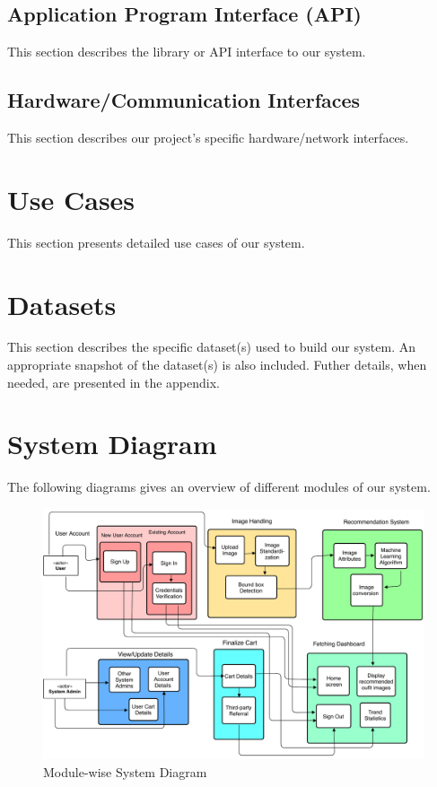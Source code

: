 \subsection{Application Program Interface (API)}
This section describes the library or API interface to our system.

\subsection{Hardware/Communication Interfaces}
This section describes our project's specific hardware/network interfaces.

\section{Use Cases}
This section presents detailed use cases of our system.

\section{Datasets}
This section describes the specific dataset(s) used to build our system. An appropriate snapshot of the dataset(s) is also included. Futher details, when needed, are presented in the appendix.

\section{System Diagram}
The following diagrams gives an overview of different modules of our system.

\begin{figure}[ht]
\includegraphics[width=15cm]{images/systemDiagram.pdf} 
\centering
\caption{Module-wise System Diagram}
\end{figure}

